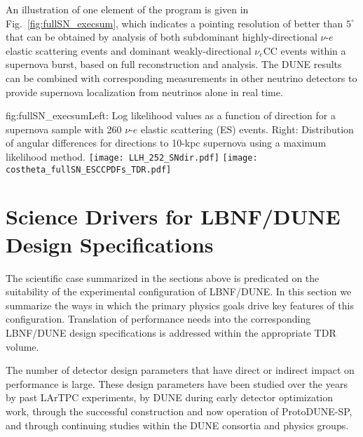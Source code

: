 An illustration 
of one element of the program is given in Fig.~\ref{fig:fullSN_execsum}, 
which indicates a pointing resolution of better than $5^\circ$ that 
can be obtained by analysis of both subdominant highly-directional $\nu$-$e$ elastic scattering 
events and dominant weakly-directional $\nu_e$CC events within a supernova burst, based 
on full reconstruction and analysis. The DUNE results can be 
combined with corresponding measurements in other neutrino detectors to 
provide supernova localization from neutrinos alone in real time.
%
\begin{dunefigure}{fig:fullSN_execsum}{Left: Log
    likelihood values as a function of direction for a
    supernova sample with 260 $\nu$-$e$ elastic scattering (ES) events.  Right: Distribution of angular differences for
    directions to 10-kpc supernova using a maximum likelihood
    method.}
  \texttt{[image: LLH\_252\_SNdir.pdf]}
  \texttt{[image: costheta\_fullSN\_ESCCPDFs\_TDR.pdf]}
\end{dunefigure}

\section{Science Drivers for LBNF/DUNE Design Specifications}
\label{sec:exec-phys-key-reqs}

The scientific case summarized in the sections above
is predicated on the suitability of the experimental
configuration of LBNF/DUNE.  In this section we summarize
the ways in which the primary physics goals drive key features
of this configuration.  
Translation of performance needs into the
corresponding LBNF/DUNE design specifications is addressed within
the appropriate TDR volume.


The number of detector design parameters that have direct
or indirect impact on performance is large.  These design
parameters have been studied over the years by past LArTPC
experiments, by DUNE during early detector optimization work,
through the successful construction and now operation of
ProtoDUNE-SP, and through continuing studies within the
DUNE consortia and physics groups.

